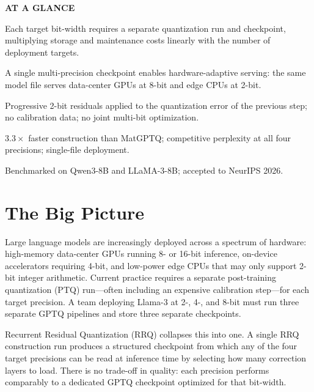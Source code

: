 \documentclass[10pt,twocolumn]{article}
\begin{document}
\begin{mdframed}[backgroundcolor=boxgray,linecolor=rulered,linewidth=1pt,
    innerleftmargin=6pt,innerrightmargin=6pt,
    innertopmargin=6pt,innerbottommargin=6pt]
\textbf{\small AT A GLANCE}\par\vspace{4pt}
\begin{description}[leftmargin=0pt,labelsep=4pt,itemsep=2pt,parsep=0pt,
    font=\small\bfseries]
  \item[Problem:] Each target bit-width requires a separate quantization run and
    checkpoint, multiplying storage and maintenance costs linearly with the number
    of deployment targets.
  \item[Why it matters:] A single multi-precision checkpoint enables hardware-adaptive
    serving: the same model file serves data-center GPUs at 8-bit and edge CPUs at 2-bit.
  \item[Method:] Progressive 2-bit residuals applied to the quantization error of the
    previous step; no calibration data; no joint multi-bit optimization.
  \item[Result:] $3.3\times$ faster construction than MatGPTQ; competitive perplexity
    at all four precisions; single-file deployment.
  \item[Evidence:] Benchmarked on Qwen3-8B and LLaMA-3-8B; accepted to NeurIPS 2026.
\end{description}
\end{mdframed}

\section{The Big Picture}

Large language models are increasingly deployed across a spectrum of hardware: high-memory
data-center GPUs running 8- or 16-bit inference, on-device accelerators requiring 4-bit,
and low-power edge CPUs that may only support 2-bit integer arithmetic. Current practice
requires a separate post-training quantization (PTQ) run---often including an expensive
calibration step---for each target precision. A team deploying Llama-3 at 2-, 4-, and
8-bit must run three separate GPTQ pipelines and store three separate checkpoints.

Recurrent Residual Quantization (RRQ) collapses this into one. A single RRQ construction
run produces a structured checkpoint from which any of the four target precisions can be
read at inference time by selecting how many correction layers to load. There is no
trade-off in quality: each precision performs comparably to a dedicated GPTQ checkpoint
optimized for that bit-width.
\end{document}
